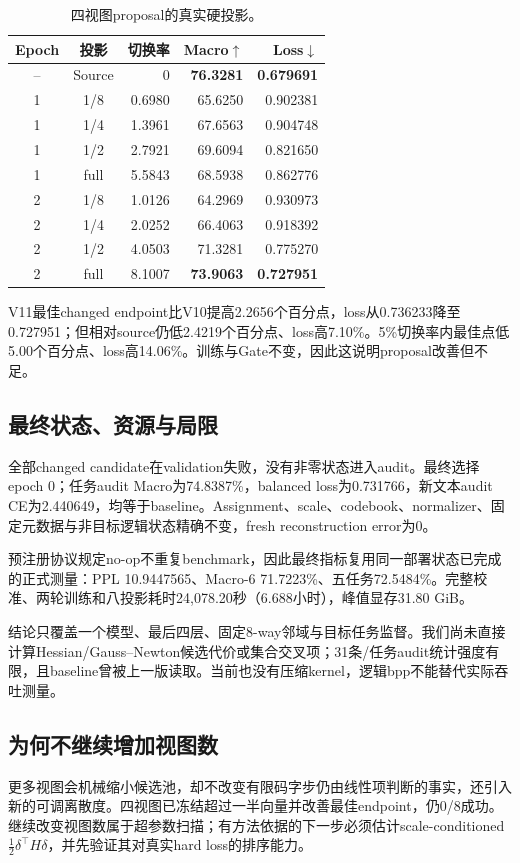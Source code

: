 \begin{table}[t]
\centering
\small
\caption{四视图proposal的真实硬投影。}
\begin{tabular}{ccrrr}
\toprule
Epoch & 投影 & 切换率 & Macro$\uparrow$ & Loss$\downarrow$\\
\midrule
-- & Source & 0 & \textbf{76.3281} & \textbf{0.679691}\\
1 & 1/8 & 0.6980 & 65.6250 & 0.902381\\
1 & 1/4 & 1.3961 & 67.6563 & 0.904748\\
1 & 1/2 & 2.7921 & 69.6094 & 0.821650\\
1 & full & 5.5843 & 68.5938 & 0.862776\\
2 & 1/8 & 1.0126 & 64.2969 & 0.930973\\
2 & 1/4 & 2.0252 & 66.4063 & 0.918392\\
2 & 1/2 & 4.0503 & 71.3281 & 0.775270\\
2 & full & 8.1007 & \textbf{73.9063} & \textbf{0.727951}\\
\bottomrule
\end{tabular}
\label{tab:projections}
\end{table}

V11最佳changed endpoint比V10提高2.2656个百分点，loss从0.736233降至0.727951；但相对source仍低2.4219个百分点、loss高7.10\%。5\%切换率内最佳点低5.00个百分点、loss高14.06\%。训练与Gate不变，因此这说明proposal改善但不足。

\subsection{最终状态、资源与局限}

全部changed candidate在validation失败，没有非零状态进入audit。最终选择epoch 0；任务audit Macro为74.8387\%，balanced loss为0.731766，新文本audit CE为2.440649，均等于baseline。Assignment、scale、codebook、normalizer、固定元数据与非目标逻辑状态精确不变，fresh reconstruction error为0。

预注册协议规定no-op不重复benchmark，因此最终指标复用同一部署状态已完成的正式测量：PPL 10.9447565、Macro-6 71.7223\%、五任务72.5484\%。完整校准、两轮训练和八投影耗时24,078.20秒（6.688小时），峰值显存31.80 GiB。

结论只覆盖一个模型、最后四层、固定8-way邻域与目标任务监督。我们尚未直接计算Hessian/Gauss--Newton候选代价或集合交叉项；31条/任务audit统计强度有限，且baseline曾被上一版读取。当前也没有压缩kernel，逻辑bpp不能替代实际吞吐测量。

\subsection{为何不继续增加视图数}

更多视图会机械缩小候选池，却不改变有限码字步仍由线性项判断的事实，还引入新的可调离散度。四视图已冻结超过一半向量并改善最佳endpoint，仍0/8成功。继续改变视图数属于超参数扫描；有方法依据的下一步必须估计scale-conditioned $\frac12\delta^\top H\delta$，并先验证其对真实hard loss的排序能力。
